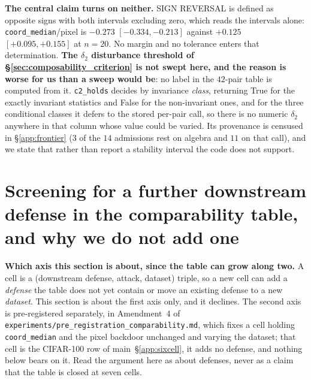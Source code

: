 \documentclass{article}
\makeatletter
\let\XRsave@bibcite\bibcite
\let\bibcite\@gobbletwo
\let\bibcite\XRsave@bibcite
\makeatother
\begin{document}
\textbf{The central claim turns on neither.} SIGN REVERSAL is defined as opposite signs with both
intervals excluding zero, which reads the intervals alone: \texttt{coord\_median}/pixel is
$-0.273$ $[-0.334,-0.213]$ against $+0.125$ $[+0.095,+0.155]$ at $n{=}20$. No margin and no tolerance enters
that determination. \textbf{The $\delta_2$ disturbance threshold of
§\ref{sec:composability_criterion} is not swept here, and the reason is worse for us than a sweep
would be}: no label in the $42$-pair table is computed from it. \texttt{c2\_holds} decides by
invariance \emph{class}, returning True for the exactly invariant statistics and False for the
non-invariant ones, and for the three conditional classes it defers to the stored per-pair call, so
there is no numeric $\delta_2$ anywhere in that column whose value could be varied. Its provenance
is censused in §\ref{app:frontier} ($3$ of the $14$ admissions rest on algebra and $11$ on
that call), and we state that rather than report a stability interval the code does not support.

\section{Screening for a further downstream defense in the comparability table, and why we do not add one}
\label{app:cell7}

\textbf{Which axis this section is about, since the table can grow along two.} A cell is a
(downstream defense, attack, dataset) triple, so a new cell can add a \emph{defense} the table does not
yet contain or move an existing defense to a new \emph{dataset}. This section is about the first axis
only, and it declines. The second axis is pre-registered separately, in Amendment~4 of
\texttt{experiments/\allowbreak pre\_registration\_comparability.md}, which fixes a cell holding
\texttt{coord\_median} and the pixel backdoor unchanged and varying the dataset; that cell is the
CIFAR-100 row of main~§\ref{app:sixcell}, it adds no defense, and nothing below bears on it. Read the
argument here as about defenses, never as a claim that the table is closed at seven cells.
\end{document}

